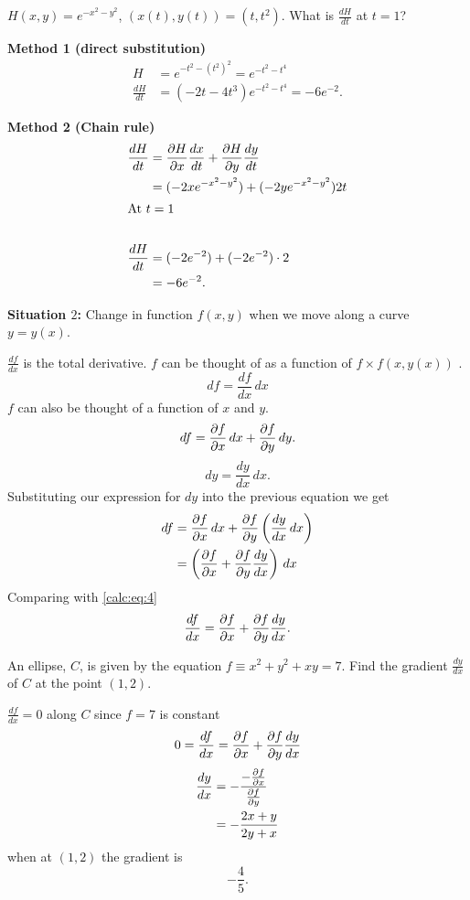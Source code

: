 \documentclass[10pt, a4paper]{article}
\begin{document}
\begin{example}
    $H(x, y) = e ^ {-x ^ 2 - y ^ 2}$,
    $(x(t), y(t)) = (t, t ^ 2)$.
    What is $\frac{dH}{dt}$ at $t = 1$?
    \begin{solution}
        \textbf{Method 1 (direct substitution)}
        \begin{align*}
            H &= e ^ {-t ^ 2 - (t ^ 2) ^ 2} = e ^ {-t ^ 2 - t ^ 4} \\
            \frac{dH}{dt} &= (-2t - 4t ^ 3)e ^ {-t ^ 2 - t ^ 4} = -6e ^ {-2}.
        \end{align*}

        \textbf{Method 2 (Chain rule)}
        \begin{align*}
            \frac{dH}{dt} &= \frac{\partial H}{\partial x}\frac{dx}{dt} + \frac{\partial H}{\partial y}\frac{dy}{dt} \\
            &= (-2xe ^ {-x ^ 2 - y ^ 2}) + (-2ye ^ {-x ^ 2 - y ^ 2})2t \\
            \intertext{At $t = 1$} \\
            \frac{dH}{dt} &= (-2e ^ {-2}) + (-2e ^ {-2}) \cdot 2\\
            &= -6e ^ {-2}.
        \end{align*}
    \end{solution}
\end{example}

\textbf{Situation $2$:}
Change in function $f(x, y)$ when we move along a curve $y = y(x)$.

$\frac{df}{dx}$ is the total derivative.
$f$ can be thought of as a function of $f \times f(x, y(x))$ .
\begin{equation}\label{calc:eq:4}
    df = \frac{df}{dx}\,dx
\end{equation}
$f$ can also be thought of a function of $x$ and $y$.
\[
df = \pd[f]{x}\,dx + \pd[f]{y}\,dy.
\]
\[
dy = \frac{dy}{dx}\,dx.
\]
Substituting our expression for $dy$ into the previous equation we get
\begin{align*}
    df &= \pd[f]{x}\,dx + \pd[f]{y}\left(\frac{dy}{dx}\,dx\right) \\
    &= \left(\pd[f]{x} + \pd[f]{y}\frac{dy}{dx}\right)\,dx
\end{align*}
Comparing with \eqref{calc:eq:4}
\[
\frac{df}{dx} = \pd[f]{x} + \pd[f]{y}\frac{dy}{dx}.
\]
\begin{example}
    An ellipse,
    $C$,
    is given by the equation $f \equiv x ^ 2 + y ^ 2 + xy = 7$.
    Find the gradient $\frac{dy}{dx}$ of $C$ at the point $(1, 2)$.

    \begin{solution}
        $\frac{df}{dx} = 0$ along $C$ since $f = 7$ is constant
        \[
        0 = \frac{df}{dx} = \pd[f]{x} + \pd[f]{y}\frac{dy}{dx} \\
        \]
        \begin{align*}
            \frac{dy}{dx} &= -\frac{-\pd[f]{x}}{\pd[f]{y}} \\
            &= -\frac{2x + y}{2y + x}
        \end{align*}
        when at $(1, 2)$ the gradient is
        \[
        -\frac{4}{5}.
        \]
    \end{solution}
\end{example}
\end{document}
